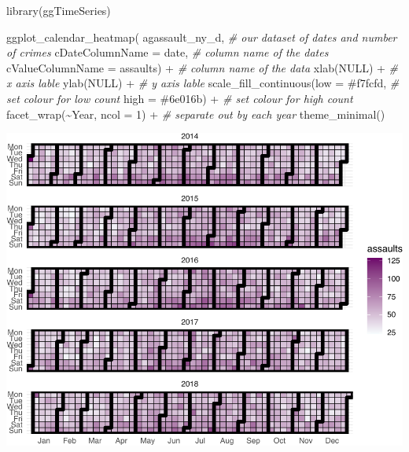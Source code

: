\documentclass[
]{book}
\newenvironment{Shaded}{\begin{snugshade}}{\end{snugshade}}
\newcommand{\AttributeTok}[1]{\textcolor[rgb]{0.77,0.63,0.00}{#1}}
\newcommand{\CommentTok}[1]{\textcolor[rgb]{0.56,0.35,0.01}{\textit{#1}}}
\newcommand{\ConstantTok}[1]{\textcolor[rgb]{0.00,0.00,0.00}{#1}}
\newcommand{\DecValTok}[1]{\textcolor[rgb]{0.00,0.00,0.81}{#1}}
\newcommand{\FunctionTok}[1]{\textcolor[rgb]{0.00,0.00,0.00}{#1}}
\newcommand{\NormalTok}[1]{#1}
\newcommand{\SpecialCharTok}[1]{\textcolor[rgb]{0.00,0.00,0.00}{#1}}
\newcommand{\StringTok}[1]{\textcolor[rgb]{0.31,0.60,0.02}{#1}}
\begin{document}
\begin{Shaded}
\begin{Highlighting}[]
\FunctionTok{library}\NormalTok{(ggTimeSeries)}

\FunctionTok{ggplot\_calendar\_heatmap}\NormalTok{(}
\NormalTok{   agassault\_ny\_d,  }\CommentTok{\# our dataset of dates and number of crimes}
   \AttributeTok{cDateColumnName =} \StringTok{\textquotesingle{}date\textquotesingle{}}\NormalTok{, }\CommentTok{\# column name of the dates}
   \AttributeTok{cValueColumnName =} \StringTok{\textquotesingle{}assaults\textquotesingle{}}\NormalTok{) }\SpecialCharTok{+} \CommentTok{\# column name of the data}
   \FunctionTok{xlab}\NormalTok{(}\ConstantTok{NULL}\NormalTok{) }\SpecialCharTok{+} \CommentTok{\# x axis lable}
   \FunctionTok{ylab}\NormalTok{(}\ConstantTok{NULL}\NormalTok{) }\SpecialCharTok{+} \CommentTok{\# y axis lable}
   \FunctionTok{scale\_fill\_continuous}\NormalTok{(}\AttributeTok{low =} \StringTok{\textquotesingle{}\#f7fcfd\textquotesingle{}}\NormalTok{,  }\CommentTok{\# set colour for low count}
                         \AttributeTok{high =} \StringTok{\textquotesingle{}\#6e016b\textquotesingle{}}\NormalTok{) }\SpecialCharTok{+}   \CommentTok{\# set colour for high count}
  \FunctionTok{facet\_wrap}\NormalTok{(}\SpecialCharTok{\textasciitilde{}}\NormalTok{Year, }\AttributeTok{ncol =} \DecValTok{1}\NormalTok{) }\SpecialCharTok{+}  \CommentTok{\# separate out by each year}
  \FunctionTok{theme\_minimal}\NormalTok{()}
\end{Highlighting}
\end{Shaded}

\includegraphics{crime_mapping_files/figure-latex/unnamed-chunk-173-1.pdf}
\end{document}
